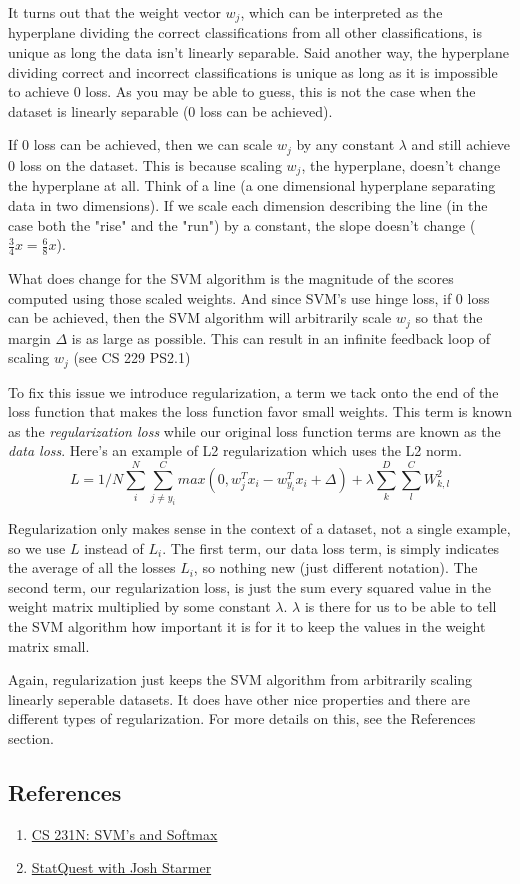 \documentclass[12pt]{article}
\begin{document}
It turns out that the weight vector $w_j$, which can be interpreted as the hyperplane dividing
the correct classifications from all other classifications, is unique as long the data
isn't linearly separable. Said another way, the hyperplane dividing correct and incorrect 
classifications is unique as long as it is impossible to achieve 0 loss.
As you may be able to guess, this is not the case when the dataset is linearly 
separable (0 loss can be achieved). 

If 0 loss can be achieved, then we can scale $w_j$ by any constant $\lambda$ and still
achieve 0 loss on the dataset. This is because scaling $w_j$, the hyperplane, doesn't change
the hyperplane at all. Think of a line (a one dimensional hyperplane separating data
in two dimensions). If we scale each dimension describing the line (in the case both the "rise"
and the "run") by a constant, the slope doesn't change ($\frac{3}{4}x = \frac{6}{8}x$).

What does change for the SVM algorithm is the magnitude of the scores computed using
those scaled weights. And since SVM's use hinge loss, if 0 loss can be achieved, 
then the SVM algorithm will arbitrarily scale $w_j$ so that the margin $\Delta$ is as large 
as possible. This can result in an infinite feedback loop of scaling $w_j$ (see CS 229 
PS2.1)

To fix this issue we introduce regularization, a term we tack onto the end of the loss function
that makes the loss function favor small weights. This term is known as the \emph{regularization 
loss} while our original loss function terms are known as the \emph{data loss}. 
Here's an example of L2 regularization which uses the L2 norm. 
\begin{equation}
    L = 1/N \sum_{i}^N \sum_{j \neq y_{i}}^C max(0, w_{j}^T x_i - w_{y_i}^T x_i + \Delta)
    + \lambda \sum_{k}^D \sum_{l}^C W_{k, l}^2
\end{equation}

Regularization only makes sense in the context of a dataset, not a single example, 
so we use $L$ instead of $L_i$. The first term, our data loss term, is simply indicates the average of all
the losses $L_i$, so nothing new (just different notation). The second term, our 
regularization loss, is just the sum every squared value in the weight matrix multiplied
by some constant $\lambda$. $\lambda$ is there for us to be able to tell the SVM algorithm how 
important it is for it to keep the values in the weight matrix small. 

Again, regularization just keeps the SVM algorithm from arbitrarily scaling linearly seperable datasets. It does
have other nice properties and there are different types of regularization.
For more details on this, see the References section.





\subsection{References}
\begin{enumerate}
    \item \href{https://cs231n.github.io/linear-classify/#svm-vs-softmax}{CS 231N: SVM's and Softmax }
    \item \href{https://www.youtube.com/watch?v=efR1C6CvhmE}{StatQuest with Josh Starmer}
\end{enumerate}
\end{document}
